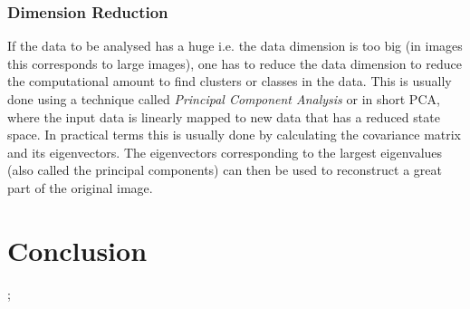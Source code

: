 


\subsubsection{Dimension Reduction}
If the data to be analysed has a huge i.e. the data dimension is too big (in images this corresponds to large images), one has to reduce the data dimension to reduce the computational amount to find clusters or classes in the data. This is usually done using a technique called \textit{Principal Component Analysis} or in short PCA, where the input data is linearly mapped to new data that has a reduced state space. In practical terms this is usually done by calculating the covariance matrix and its eigenvectors. The eigenvectors corresponding to the largest eigenvalues (also called the principal components) can then be used to reconstruct a great part of the original image.

\section{Conclusion}

;